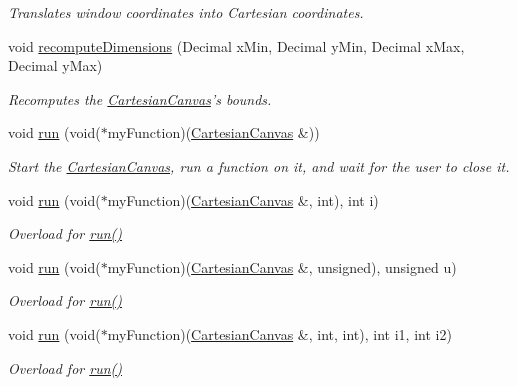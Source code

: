 \begin{DoxyCompactItemize}
\begin{DoxyCompactList}\small\item\em \-Translates window coordinates into \-Cartesian coordinates. \end{DoxyCompactList}\item 
void \hyperlink{classtsgl_1_1_cartesian_canvas_ac833a44fe7367f6411292707de37beef}{recompute\-Dimensions} (\-Decimal x\-Min, \-Decimal y\-Min, \-Decimal x\-Max, \-Decimal y\-Max)
\begin{DoxyCompactList}\small\item\em \-Recomputes the \hyperlink{classtsgl_1_1_cartesian_canvas}{\-Cartesian\-Canvas}'s bounds. \end{DoxyCompactList}\item 
void \hyperlink{classtsgl_1_1_cartesian_canvas_a63a948af53582b713957b872a765dcdb}{run} (void($\ast$my\-Function)(\hyperlink{classtsgl_1_1_cartesian_canvas}{\-Cartesian\-Canvas} \&))
\begin{DoxyCompactList}\small\item\em \-Start the \hyperlink{classtsgl_1_1_cartesian_canvas}{\-Cartesian\-Canvas}, run a function on it, and wait for the user to close it. \end{DoxyCompactList}\item 
void \hyperlink{classtsgl_1_1_cartesian_canvas_a4d50613e241cab83878aa4438f3db67e}{run} (void($\ast$my\-Function)(\hyperlink{classtsgl_1_1_cartesian_canvas}{\-Cartesian\-Canvas} \&, int), int i)
\begin{DoxyCompactList}\small\item\em \-Overload for \hyperlink{classtsgl_1_1_cartesian_canvas_a63a948af53582b713957b872a765dcdb}{run()} \end{DoxyCompactList}\item 
void \hyperlink{classtsgl_1_1_cartesian_canvas_ab18eee19a5a0c7011c4442b64d05f6cc}{run} (void($\ast$my\-Function)(\hyperlink{classtsgl_1_1_cartesian_canvas}{\-Cartesian\-Canvas} \&, unsigned), unsigned u)
\begin{DoxyCompactList}\small\item\em \-Overload for \hyperlink{classtsgl_1_1_cartesian_canvas_a63a948af53582b713957b872a765dcdb}{run()} \end{DoxyCompactList}\item 
void \hyperlink{classtsgl_1_1_cartesian_canvas_aae4be78e02055eed3e6e85bb39411f21}{run} (void($\ast$my\-Function)(\hyperlink{classtsgl_1_1_cartesian_canvas}{\-Cartesian\-Canvas} \&, int, int), int i1, int i2)
\begin{DoxyCompactList}\small\item\em \-Overload for \hyperlink{classtsgl_1_1_cartesian_canvas_a63a948af53582b713957b872a765dcdb}{run()} \end{DoxyCompactList}\item 

\end{DoxyCompactItemize}
